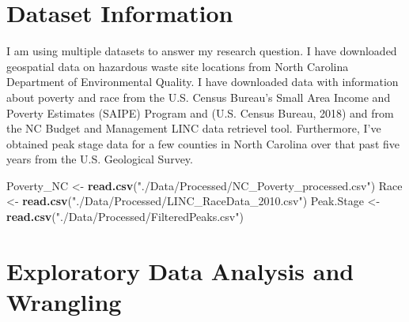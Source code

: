 \documentclass[12pt,]{article}
\newenvironment{Shaded}{\begin{snugshade}}{\end{snugshade}}
\newcommand{\KeywordTok}[1]{\textcolor[rgb]{0.13,0.29,0.53}{\textbf{#1}}}
\newcommand{\StringTok}[1]{\textcolor[rgb]{0.31,0.60,0.02}{#1}}
\newcommand{\NormalTok}[1]{#1}
\begin{document}
\newpage

\section{Dataset Information}\label{dataset-information}

I am using multiple datasets to answer my research question. I have
downloaded geospatial data on hazardous waste site locations from North
Carolina Department of Environmental Quality. I have downloaded data
with information about poverty and race from the U.S. Census Bureau's
Small Area Income and Poverty Estimates (SAIPE) Program and (U.S. Census
Bureau, 2018) and from the NC Budget and Management LINC data retrievel
tool. Furthermore, I've obtained peak stage data for a few counties in
North Carolina over that past five years from the U.S. Geological
Survey.

\begin{Shaded}
\begin{Highlighting}[]
\NormalTok{Poverty_NC <-}\StringTok{ }\KeywordTok{read.csv}\NormalTok{(}\StringTok{"./Data/Processed/NC_Poverty_processed.csv"}\NormalTok{)}
\NormalTok{Race <-}\StringTok{ }\KeywordTok{read.csv}\NormalTok{(}\StringTok{"./Data/Processed/LINC_RaceData_2010.csv"}\NormalTok{)}
\NormalTok{Peak.Stage <-}\StringTok{ }\KeywordTok{read.csv}\NormalTok{(}\StringTok{"./Data/Processed/FilteredPeaks.csv"}\NormalTok{)  }
\end{Highlighting}
\end{Shaded}

\newpage

\section{Exploratory Data Analysis and
Wrangling}\label{exploratory-data-analysis-and-wrangling}
\end{document}
